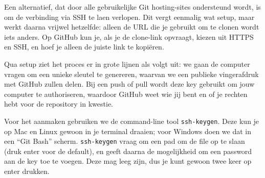 Een alternatief, dat door alle gebruikelijke Git hosting-sites ondersteund wordt, is om de verbinding via SSH te laen verlopen. Dit vergt eenmalig wat setup, maar werkt daarna vrijwel hetzelfde: alleen de URL die je gebruikt om te clonen wordt iets anders. Op GitHub kun je, als je de clone-link opvraagt, kiezen uit HTTPS en SSH, en hoef je alleen de juiste link te kopi\"eren.

Qua setup ziet het proces er in grote lijnen als volgt uit: we gaan de computer vragen om een unieke sleutel te genereren, waarvan we een publieke vingerafdruk met GitHub zullen delen. Bij een push of pull wordt deze key gebruikt om jouw computer te authoriseren, waardoor GitHub weet wie jij bent en of je rechten hebt voor de repository in kwestie.

Voor het aanmaken gebruiken we de command-line tool \texttt{ssh-keygen}. Deze kun je op Mac en Linux gewoon in je terminal draaien; voor Windows doen we dat in een \enquote{Git Bash} scherm. \texttt{ssh-keygen} vraag om een pad om de file op te slaan (druk enter voor de default), en geeft daarna de mogelijkheid om een password aan de key toe te voegen. Deze mag leeg zijn, dus je kunt gewoon twee keer op enter drukken.

